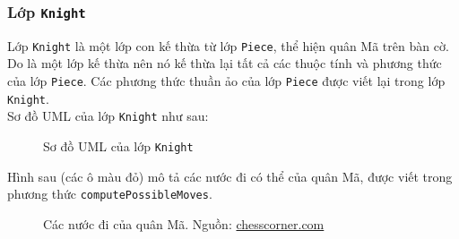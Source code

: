 \subsubsection{Lớp \lstinline{Knight}}
Lớp \lstinline{Knight} là một lớp con kế thừa từ lớp \lstinline{Piece}, thể hiện quân Mã trên bàn cờ. Do là một lớp kế thừa nên nó kế thừa lại tất cả các thuộc tính và phương thức của lớp \lstinline{Piece}. Các phương thức thuần ảo của lớp \lstinline{Piece} được viết lại trong lớp \lstinline{Knight}.\\
Sơ đồ UML của lớp \lstinline{Knight} như sau:
\begin{figure}[H]
\caption{Sơ đồ UML của lớp \lstinline{Knight}}
\end{figure}
Hình sau (các ô màu đỏ) mô tả các nước đi có thể của quân Mã, được viết trong phương thức \lstinline{computePossibleMoves}.
\begin{figure}[H]
\caption{Các nước đi của quân Mã. Nguồn: \url{chesscorner.com}}
\end{figure}


